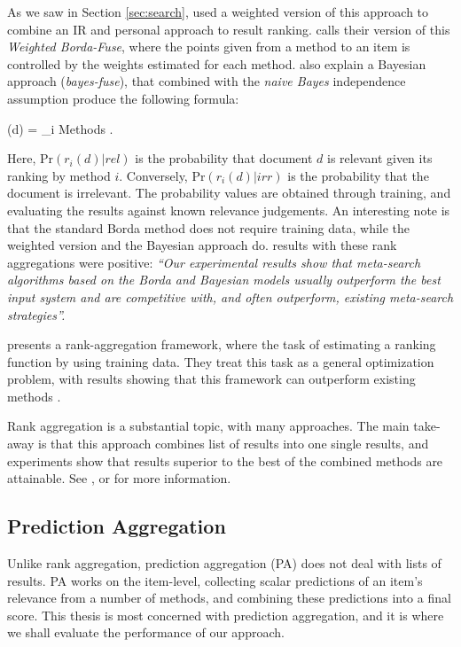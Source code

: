 As we saw in Section \ref{sec:search}, \citet[p3]{Xu2008} used a weighted version
of this approach to combine an IR and personal approach to result ranking.
\citet[p3]{Aslam2001} calls their version of this \emph{Weighted Borda-Fuse},
where the points given from a method to an item is controlled
by the weights estimated for each method.
\citet[p4]{Aslam2001} also explain a Bayesian approach (\emph{bayes-fuse}),
that combined with the \emph{naive Bayes} independence assumption 
produce the following formula:

\begin{eqsp}
  (d)  = \sum_{i \in Methods} \log 
    .
\end{eqsp}

Here, $\mathrm{Pr}(r_i(d) | rel)$ is the probability that document $d$
is relevant given its ranking by method $i$.
Conversely, $\mathrm{Pr}(r_i(d) | irr)$ is the probability that the document 
is irrelevant. The probability values are obtained through training,
and evaluating the results against known relevance judgements.
An interesting note is that the standard Borda method does not require training data,
while the weighted version and the Bayesian approach do.
\citet{Aslam2001} results with these rank aggregations were positive:
\emph{``Our experimental results show that meta-search algorithms based on the 
Borda and Bayesian models usually outperform the best input system 
and are competitive with, and often outperform, 
existing meta-search strategies''.}

\cite{Liu2007} presents a rank-aggregation framework, where
the task of estimating a ranking function by using training data.
They treat this task as a general optimization problem, with results
showing that this framework can outperform existing methods \cite[p7]{Liu2007}.

Rank aggregation is a substantial topic, with many approaches.
The main take-away is that this approach combines list of results
into one single results, and experiments show that results superior
to the best of the combined methods are attainable.
See \cite{Aslam2001}, \cite{Liu2007} or \cite{Klementiev2008} 
for more information.


\subsection{Prediction Aggregation}
\label{sec:theory:predictionagg}

Unlike rank aggregation, prediction aggregation (PA) does not deal with lists of results.
PA works on the item-level, collecting scalar predictions of an item's relevance from a number of methods,
and combining these predictions into a final score.
This thesis is most concerned with prediction aggregation,
and it is where we shall evaluate the performance of our approach.

